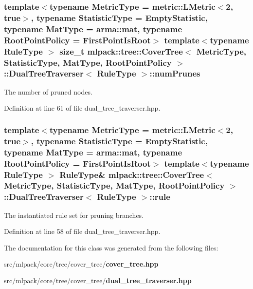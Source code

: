 \subsubsection[{num\+Prunes}]{\setlength{\rightskip}{0pt plus 5cm}template$<$typename Metric\+Type  = metric\+::\+L\+Metric$<$2, true$>$, typename Statistic\+Type  = Empty\+Statistic, typename Mat\+Type  = arma\+::mat, typename Root\+Point\+Policy  = First\+Point\+Is\+Root$>$ template$<$typename Rule\+Type $>$ size\+\_\+t {\bf mlpack\+::tree\+::\+Cover\+Tree}$<$ Metric\+Type, Statistic\+Type, Mat\+Type, Root\+Point\+Policy $>$\+::{\bf Dual\+Tree\+Traverser}$<$ Rule\+Type $>$\+::num\+Prunes\hspace{0.3cm}{\ttfamily [private]}}\label{classmlpack_1_1tree_1_1CoverTree_1_1DualTreeTraverser_a5d967138d4edbc222c4eff03179a101f}


The number of pruned nodes. 



Definition at line 61 of file dual\+\_\+tree\+\_\+traverser.\+hpp.

\subsubsection[{rule}]{\setlength{\rightskip}{0pt plus 5cm}template$<$typename Metric\+Type  = metric\+::\+L\+Metric$<$2, true$>$, typename Statistic\+Type  = Empty\+Statistic, typename Mat\+Type  = arma\+::mat, typename Root\+Point\+Policy  = First\+Point\+Is\+Root$>$ template$<$typename Rule\+Type $>$ Rule\+Type\& {\bf mlpack\+::tree\+::\+Cover\+Tree}$<$ Metric\+Type, Statistic\+Type, Mat\+Type, Root\+Point\+Policy $>$\+::{\bf Dual\+Tree\+Traverser}$<$ Rule\+Type $>$\+::rule\hspace{0.3cm}{\ttfamily [private]}}\label{classmlpack_1_1tree_1_1CoverTree_1_1DualTreeTraverser_ad01ff60efb1f40c2aeb166a3c5e8ccab}


The instantiated rule set for pruning branches. 



Definition at line 58 of file dual\+\_\+tree\+\_\+traverser.\+hpp.



The documentation for this class was generated from the following files\+:\begin{DoxyCompactItemize}
\item 
src/mlpack/core/tree/cover\+\_\+tree/{\bf cover\+\_\+tree.\+hpp}\item 
src/mlpack/core/tree/cover\+\_\+tree/{\bf dual\+\_\+tree\+\_\+traverser.\+hpp}\end{DoxyCompactItemize}
